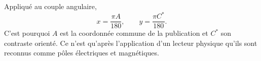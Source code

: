 Appliqué au couple angulaire,
\[
x=\frac{\pi A}{180},\qquad y=\frac{\pi C^*}{180}.
\]
C'est pourquoi \(A\) est la coordonnée commune de la publication et \(C^*\) son
contraste orienté. Ce n'est qu'après l'application d'un lecteur physique qu'ils sont reconnus
comme pôles électriques et magnétiques.

